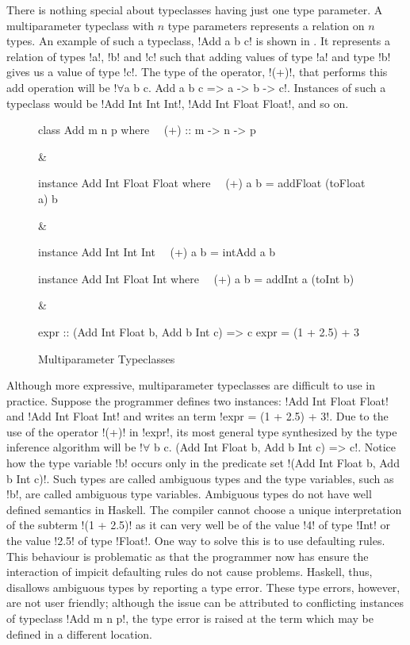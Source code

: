 \documentclass[format=acmsmall,manuscript,review,screen,nonacm,margin=1in,11pt]{acmart}
\begin{document}
There is nothing special about typeclasses having just one type parameter. 
A multiparameter typeclass with $n$ type parameters represents a relation on $n$ types.
An example of such a typeclass, !Add a b c! is shown in .
It represents a relation of types !a!, !b! and !c! such that adding values of type !a! and type !b!
gives us a value of type !c!. The type of the operator, !(+)!, that performs this add operation will be
!$\forall$a b c. Add a b c => a -> b -> c!. Instances of such a typeclass would be !Add Int Int Int!,
!Add Int Float Float!, and so on.
\begin{figure}[ht]
  \footnotesize
  \begin{tabularx}\textwidth{c c c}
\begin{code}^^J
class Add m n p where^^J
\ \ (+) :: m -> n -> p^^J
\end{code}&%
\begin{code}^^J
instance Add Int Float Float where^^J
\ \ (+) a b = addFloat (toFloat a) b^^J
\end{code}&%
\begin{code}^^J
instance Add Int Int Int^^J
\ \ (+) a b = intAdd a b^^J
\end{code}
  \end{tabularx}
  \begin{tabularx}\textwidth{X X}
\begin{code}^^J
instance Add Int Float Int where^^J
\ \ (+) a b = addInt a (toInt b)^^J
\end{code}&%
\begin{code}^^J
expr :: (Add Int Float b, Add b Int c) => c^^J
expr = (1 + 2.5) + 3^^J
\end{code}
  \end{tabularx}
  \caption{Multiparameter Typeclasses}
  \label{fig:multip-typeclass}
\end{figure}

Although more expressive, multiparameter typeclasses are difficult to use in practice.
Suppose the programmer defines two instances: !Add Int Float Float! and !Add Int Float Int!
and writes an term !expr = (1 + 2.5) + 3!.
Due to the use of the operator !(+)! in !expr!, its most general type synthesized
by the type inference algorithm will be !$\forall$ b c. (Add Int Float b, Add b Int c) => c!.
Notice how the type variable !b! occurs only in the predicate set !(Add Int Float b, Add b Int c)!.
Such types are called ambiguous types and the type variables, such as !b!,
are called ambiguous type variables. Ambiguous types do not have well defined semantics in Haskell.
The compiler cannot choose a unique interpretation of the subterm !(1 + 2.5)! as it can very well be
of the value !4! of type !Int! or the value !2.5! of type !Float!.
One way to solve this is to use defaulting rules. This behaviour is problematic
as that the programmer now has ensure the interaction of impicit defaulting
rules do not cause problems. Haskell, thus, disallows ambiguous types by reporting a type error.
These type errors, however, are not user friendly; although the issue can be attributed
to conflicting instances of typeclass !Add m n p!, the type error is raised at the term
which may be defined in a different location.
\end{document}
